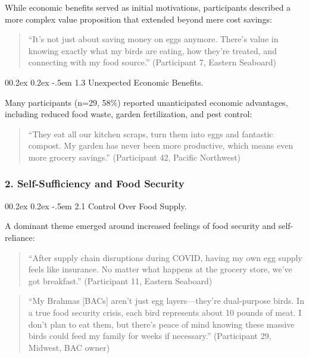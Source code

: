 \documentclass[
  man,
  floatsintext,
  longtable,
  nolmodern,
  notxfonts,
  notimes,
  colorlinks=true,linkcolor=blue,citecolor=blue,urlcolor=blue]{apa7}
\makeatletter
\renewcommand{\paragraph}{\@startsection{paragraph}{4}{\parindent}%
	{0\baselineskip \@plus 0.2ex \@minus 0.2ex}%
	{-.5em}%
	{\normalfont\normalsize\bfseries\typesectitle}}
\makeatother
\begin{document}
While economic benefits served as initial motivations, participants
described a more complex value proposition that extended beyond mere
cost savings:

\begin{quote}
``It's not just about saving money on eggs anymore. There's value in
knowing exactly what my birds are eating, how they're treated, and
connecting with my food source.'' (Participant 7, Eastern Seaboard)
\end{quote}

\paragraph{1.3 Unexpected Economic
Benefits.}\label{unexpected-economic-benefits}

Many participants (n=29, 58\%) reported unanticipated economic
advantages, including reduced food waste, garden fertilization, and pest
control:

\begin{quote}
``They eat all our kitchen scraps, turn them into eggs and fantastic
compost. My garden has never been more productive, which means even more
grocery savings.'' (Participant 42, Pacific Northwest)
\end{quote}

\subsubsection{2. Self-Sufficiency and Food
Security}\label{self-sufficiency-and-food-security}

\paragraph{2.1 Control Over Food
Supply.}\label{control-over-food-supply}

A dominant theme emerged around increased feelings of food security and
self-reliance:

\begin{quote}
``After supply chain disruptions during COVID, having my own egg supply
feels like insurance. No matter what happens at the grocery store, we've
got breakfast.'' (Participant 11, Eastern Seaboard)
\end{quote}

\begin{quote}
``My Brahmas {[}BACs{]} aren't just egg layers---they're dual-purpose
birds. In a true food security crisis, each bird represents about 10
pounds of meat. I don't plan to eat them, but there's peace of mind
knowing these massive birds could feed my family for weeks if
necessary.'' (Participant 29, Midwest, BAC owner)
\end{quote}
\end{document}
